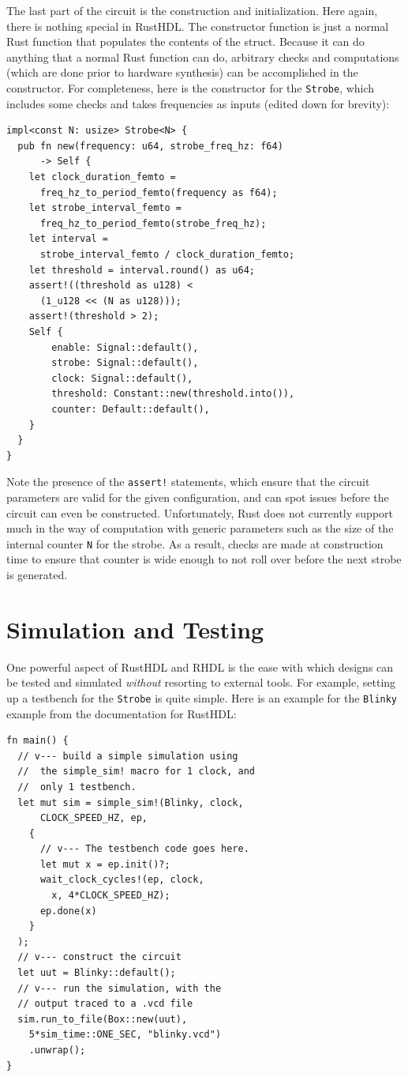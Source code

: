 \documentclass[conference]{IEEEtran}
\begin{document}
The last part of the circuit is the construction and initialization.  Here again, there is nothing special in RustHDL.  The 
constructor function is just a normal Rust function that populates the contents of the struct.  Because it can do anything
that a normal Rust function can do, arbitrary checks and computations (which are done prior to hardware synthesis) can be 
accomplished in the constructor.  For completeness, here is the constructor for the \verb|Strobe|, which includes some checks 
and takes frequencies as inputs (edited down for brevity):

\begin{verbatim}
impl<const N: usize> Strobe<N> {
  pub fn new(frequency: u64, strobe_freq_hz: f64)
      -> Self {
    let clock_duration_femto = 
      freq_hz_to_period_femto(frequency as f64);
    let strobe_interval_femto = 
      freq_hz_to_period_femto(strobe_freq_hz);
    let interval = 
      strobe_interval_femto / clock_duration_femto;
    let threshold = interval.round() as u64;
    assert!((threshold as u128) < 
      (1_u128 << (N as u128)));
    assert!(threshold > 2);
    Self {
        enable: Signal::default(),
        strobe: Signal::default(),
        clock: Signal::default(),
        threshold: Constant::new(threshold.into()),
        counter: Default::default(),
    }
  }
}
\end{verbatim}

Note the presence of the \verb|assert!| statements, which ensure that the circuit parameters are valid for the given configuration, and
can spot issues before the circuit can even be constructed.  Unfortunately, Rust does not currently support much in the way of computation with generic parameters such as the 
size of the internal counter \verb|N| for the strobe.  As a result, checks are made at construction time to ensure that 
counter is wide enough to not roll over before the next strobe is generated.

\section{Simulation and Testing}

One powerful aspect of RustHDL and RHDL is the ease with which designs can be tested and simulated \emph{without} 
resorting to external tools.  For example, setting up a testbench for the \verb|Strobe| is quite simple.  Here is an example
for the \verb|Blinky| example from the documentation for RustHDL:

\begin{verbatim}
fn main() {
  // v--- build a simple simulation using
  //  the simple_sim! macro for 1 clock, and
  //  only 1 testbench.
  let mut sim = simple_sim!(Blinky, clock, 
      CLOCK_SPEED_HZ, ep, 
    {
      // v--- The testbench code goes here.
      let mut x = ep.init()?;
      wait_clock_cycles!(ep, clock, 
        x, 4*CLOCK_SPEED_HZ);
      ep.done(x)
    }
  );
  // v--- construct the circuit
  let uut = Blinky::default();
  // v--- run the simulation, with the 
  // output traced to a .vcd file
  sim.run_to_file(Box::new(uut), 
    5*sim_time::ONE_SEC, "blinky.vcd")
    .unwrap();
}
\end{verbatim}
\end{document}
